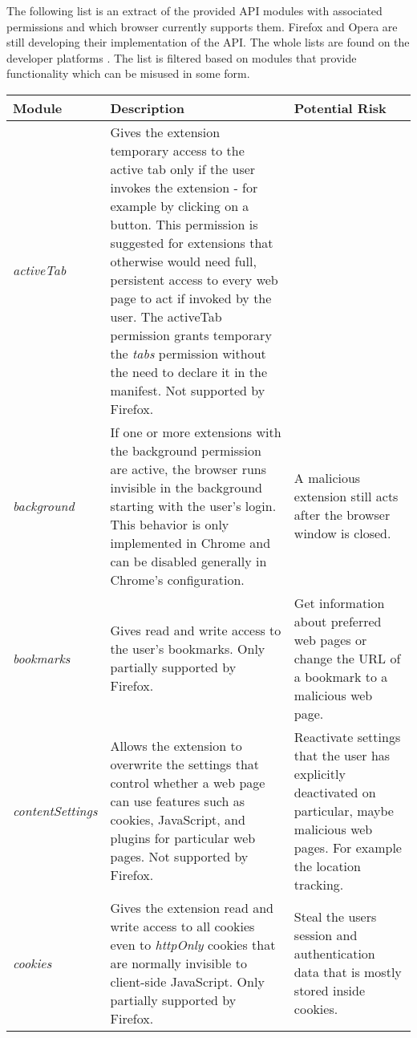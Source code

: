 	The following list is an extract of the provided API modules with associated permissions and which browser currently supports them. Firefox and Opera are still developing their implementation of the API. The whole lists are found on the developer platforms \cite{chromeDevApiList, operaDevApiList, mozillaDevApiList}. The list is filtered based on modules that provide functionality which can be misused in some form. \\
	
	\begin{tabular}{lp{}p{}}
		\textbf{Module} & \textbf{Description} & \textbf{Potential Risk} \\ 
		\hline
		
		\textit{activeTab} & Gives the extension temporary access to the active tab only if the user invokes the extension - for example by clicking on a button. This permission is suggested for extensions that otherwise would need full, persistent access to every web page to act if invoked by the user. The activeTab permission grants temporary the \textit{tabs} permission without the need to declare it in the manifest. Not supported by Firefox. &  \\
		
		\textit{background} & If one or more extensions with the background permission are active, the browser runs invisible in the background starting with the user's login. This behavior is only implemented in Chrome and can be disabled generally in Chrome's configuration. & A malicious extension still acts after the browser window is closed. \\
		
		\textit{bookmarks} & Gives read and write access to the user's bookmarks. Only partially supported by Firefox. & Get information about preferred web pages or change the URL of a bookmark to a malicious web page. \\
		
		\textit{contentSettings} &	Allows the extension to overwrite the settings that control whether a web page can use features such as cookies, JavaScript, and plugins for particular web pages. Not supported by Firefox. & Reactivate settings that the user has explicitly deactivated on particular, maybe malicious web pages. For example the location tracking. \\
		
		\textit{cookies} & Gives the extension read and write access to all cookies even to \textit{httpOnly} cookies that are normally invisible to client-side JavaScript. Only partially supported by Firefox. & Steal the users session and authentication data that is mostly stored inside cookies. \\
		

\end{tabular}
